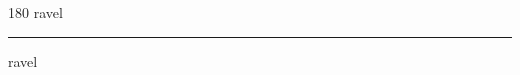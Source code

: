 
\begin{frame}
\begin{center}
\begin{turn}{180}
{\fontsize{2.5cm}{1em}\selectfont ravel}
\end{turn}
\vspace{1em}\par  
\hrule
\vspace{1em}\par  
{\fontsize{2.5cm}{1em}\selectfont ravel}
\end{center}
\end{frame}
